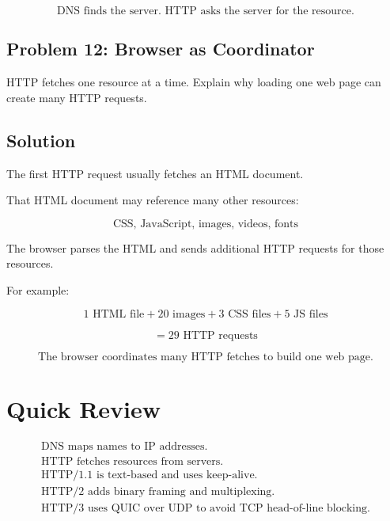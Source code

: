 \documentclass[12pt]{article}
\begin{document}
\[
\boxed{\text{DNS finds the server. HTTP asks the server for the resource.}}
\]

\subsection*{Problem 12: Browser as Coordinator}
HTTP fetches one resource at a time. Explain why loading one web page can create many HTTP requests.

\subsection*{Solution}
The first HTTP request usually fetches an HTML document.

That HTML document may reference many other resources:

\[
\text{CSS, JavaScript, images, videos, fonts}
\]

The browser parses the HTML and sends additional HTTP requests for those resources.

For example:

\[
1 \text{ HTML file} + 20 \text{ images} + 3 \text{ CSS files} + 5 \text{ JS files}
\]

\[
= 29 \text{ HTTP requests}
\]

\[
\boxed{\text{The browser coordinates many HTTP fetches to build one web page.}}
\]

\section*{Quick Review}

\[
\boxed{
\begin{array}{l}
\text{DNS maps names to IP addresses.} \\
\text{HTTP fetches resources from servers.} \\
\text{HTTP/1.1 is text-based and uses keep-alive.} \\
\text{HTTP/2 adds binary framing and multiplexing.} \\
\text{HTTP/3 uses QUIC over UDP to avoid TCP head-of-line blocking.}
\end{array}
}
\]
\end{document}
